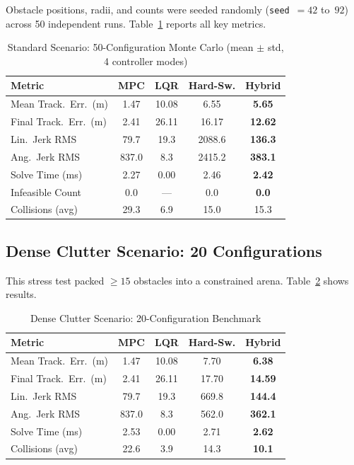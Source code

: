 \documentclass[journal]{IEEEtran}
\begin{document}
Obstacle positions, radii, and counts were seeded randomly (\texttt{seed}~$=42$
to~$92$) across 50 independent runs.
Table~\ref{tab:random50} reports all key metrics.

\begin{table}[!t]
  \caption{Standard Scenario: 50-Configuration Monte Carlo
           (mean $\pm$ std, 4 controller modes)}
  \label{tab:random50}
  \centering
  \setlength{\tabcolsep}{4pt}
  \begin{tabular}{lcccc}
    \toprule
    Metric                   & MPC    & LQR     & Hard-Sw.  & \textbf{Hybrid} \\
    \midrule
    Mean Track.\ Err.\ (m)   & 1.47   & 10.08   & 6.55      & \textbf{5.65} \\
    Final Track.\ Err.\ (m)  & 2.41   & 26.11   & 16.17     & \textbf{12.62} \\
    Lin.\ Jerk RMS            & 79.7   & 19.3    & 2088.6    & \textbf{136.3} \\
    Ang.\ Jerk RMS            & 837.0  & 8.3     & 2415.2    & \textbf{383.1} \\
    Solve Time (ms)           & 2.27   & 0.00    & 2.46      & \textbf{2.42} \\
    Infeasible Count          & 0.0    & ---     & 0.0       & \textbf{0.0} \\
    Collisions (avg)          & 29.3   & 6.9     & 15.0      & 15.3 \\
    \bottomrule
  \end{tabular}
\end{table}

\subsection{Dense Clutter Scenario: 20 Configurations}

This stress test packed $\geq\!15$ obstacles into a constrained arena.
Table~\ref{tab:dense20} shows results.

\begin{table}[!t]
  \caption{Dense Clutter Scenario: 20-Configuration Benchmark}
  \label{tab:dense20}
  \centering
  \setlength{\tabcolsep}{4pt}
  \begin{tabular}{lcccc}
    \toprule
    Metric                   & MPC    & LQR     & Hard-Sw.  & \textbf{Hybrid} \\
    \midrule
    Mean Track.\ Err.\ (m)   & 1.47   & 10.08   & 7.70      & \textbf{6.38} \\
    Final Track.\ Err.\ (m)  & 2.41   & 26.11   & 17.70     & \textbf{14.59} \\
    Lin.\ Jerk RMS            & 79.7   & 19.3    & 669.8     & \textbf{144.4} \\
    Ang.\ Jerk RMS            & 837.0  & 8.3     & 562.0     & \textbf{362.1} \\
    Solve Time (ms)           & 2.53   & 0.00    & 2.71      & \textbf{2.62} \\
    Collisions (avg)          & 22.6   & 3.9     & 14.3      & \textbf{10.1} \\
    \bottomrule
  \end{tabular}
\end{table}
\end{document}
